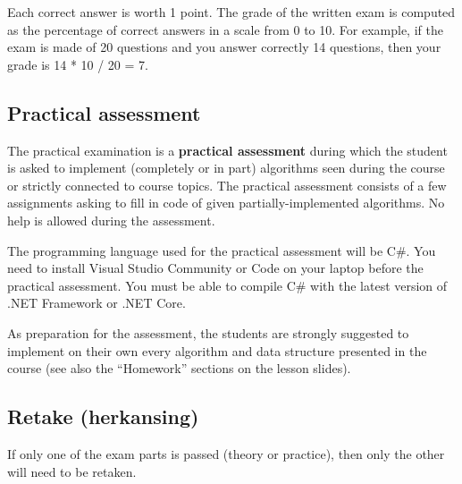 	\noindent
	Each correct answer is worth 1 point. The grade of the written exam is computed as the percentage of correct answers in a scale from 0 to 10. For example, if the exam is made of 20 questions and you answer correctly 14 questions, then your grade is 14 * 10 / 20 = 7.

	\subsection{Practical assessment}
	The practical examination is a \textbf{practical assessment} during which the student is asked to implement (completely or in part) algorithms seen during the course or strictly connected to course topics. The practical assessment consists of a few assignments asking to fill in code of given partially-implemented algorithms. No help is allowed during the assessment.
	
	The programming language used for the practical assessment will be C\#. You need to install Visual Studio Community or Code on your laptop before the practical assessment. You must be able to compile C\# with the latest version of .NET Framework or .NET Core.
	
	As preparation for the assessment, the students are strongly suggested to implement on their own every algorithm and data structure presented in the course (see also the ``Homework'' sections on the lesson slides).

	
	\subsection{Retake (herkansing)}
	If only one of the exam parts is passed (theory or practice), then only the other will need to be retaken.